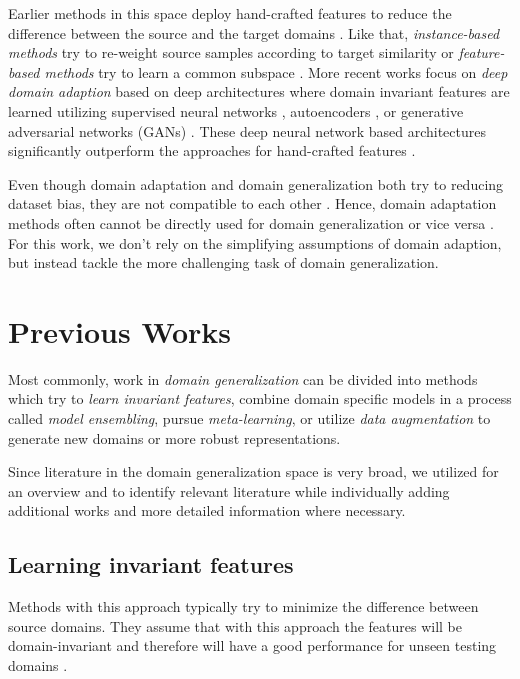 Earlier methods in this space deploy hand-crafted features to reduce the difference between the source and the target domains \citep{ManciniPBC018}. Like that, \emph{instance-based methods} try to re-weight source samples according to target similarity \citep{GongGS13, HuangSGBS06, YamadaSR12} or \emph{feature-based methods} try to learn a common subspace \citep{FernandoHST13, GongSSG12, LongD0SGY13, BaktashmotlaghHLS13}. More recent works focus on \emph{deep domain adaption} based on deep architectures where domain invariant features are learned utilizing supervised neural networks \citep{BousmalisTSKE16, CarlucciPCRB17, GaninL15, GhifaryKZBL16}, autoencoders \citep{ZengOWW14}, or generative adversarial networks (GANs) \citep{BousmalisSDEK17, ShrivastavaPTSW17, TzengHSD17}. These deep neural network based architectures significantly outperform the approaches for hand-crafted features \citep{ManciniPBC018}.

Even though domain adaptation and domain generalization both try to reducing dataset bias, they are not compatible to each other \citep{GhifaryBKZ17}. Hence, domain adaptation methods often cannot be directly used for domain generalization or vice versa \citep{GhifaryBKZ17}. For this work, we don't rely on the simplifying assumptions of domain adaption, but instead tackle the more challenging task of domain generalization.

\section{Previous Works}

Most commonly, work in \emph{domain generalization} can be divided into methods which try to \emph{learn invariant features}, combine domain specific models in a process called \emph{model ensembling}, pursue \emph{meta-learning}, or utilize \emph{data augmentation} to generate new domains or more robust representations.

Since literature in the domain generalization space is very broad, we utilized \citet[Appendix A]{gulrajani2020search} for an overview and to identify relevant literature while individually adding additional works and more detailed information where necessary.  

\subsection{Learning invariant features}

Methods with this approach typically try to minimize the difference between source domains. They assume that with this approach the features will be domain-invariant and therefore will have a good performance for unseen testing domains \citep{huang2020selfchallenging}.

